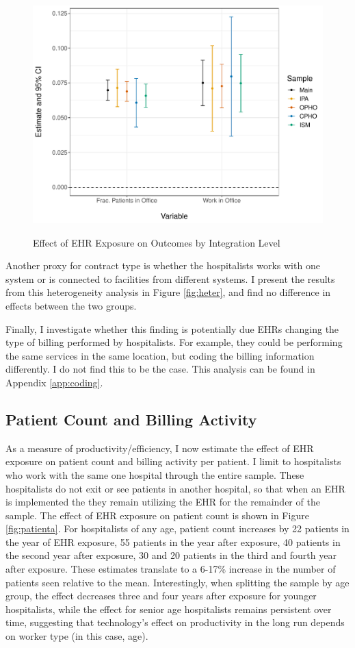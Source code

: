 \documentclass[12pt]{article}
\begin{document}
\begin{figure}
    \centering
    \caption{Effect of EHR Exposure on Outcomes by Integration Level}
    \includegraphics[width=.7\textwidth]{Objects/heterog_plot_int_office.pdf}
    \label{fig:het_int}
\end{figure}

Another proxy for contract type is whether the hospitalists works with one system or is connected to facilities from different systems. I present the results from this heterogeneity analysis in Figure \ref{fig:heter}, and find no difference in effects between the two groups. 

Finally, I investigate whether this finding is potentially due EHRs changing the type of billing performed by hospitalists. For example, they could be performing the same services in the same location, but coding the billing information differently. I do not find this to be the case. This analysis can be found in Appendix \ref{app:coding}.


\subsection{Patient Count and Billing Activity}\label{sec:patientcount}

As a measure of productivity/efficiency, I now estimate the effect of EHR exposure on patient count and billing activity per patient. I limit to hospitalists who work with the same one hospital through the entire sample. These hospitalists do not exit or see patients in another hospital, so that when an EHR is implemented the they remain utilizing the EHR for the remainder of the sample. The effect of EHR exposure on patient count is shown in Figure \ref{fig:patienta}. For hospitalists of any age, patient count increases by 22 patients in the year of EHR exposure, 55 patients in the year after exposure, 40 patients in the second year after exposure, 30 and 20 patients in the third and fourth year after exposure. These estimates translate to a 6-17\% increase in the number of patients seen relative to the mean. Interestingly, when splitting the sample by age group, the effect decreases three and four years after exposure for younger hospitalists, while the effect for senior age hospitalists remains persistent over time, suggesting that technology's effect on productivity in the long run depends on worker type (in this case, age). 
\end{document}
